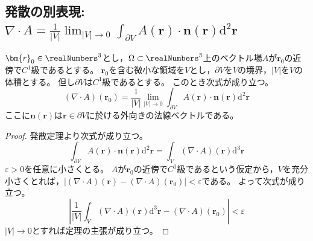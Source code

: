         \subsection{発散の別表現: \texorpdfstring{$\nabla\cdot A = \frac{1}{|V|}\lim_{|V|\to 0} \int_{\partial V} A(\bm{r})\cdot\bm{n}(\bm{r})\mathrm{d}^2\bm{r}$}{発散はベクトル場の法線面積分の体積の商の極限である}}
            \begin{shadebox}
                $\bm{r}_0\in\realNumbers^3$とし，$\Omega\subset\realNumbers^3$上のベクトル場$A$が$\bm{r}_0$の近傍で$C^1$級であるとする。
                $\bm{r}_0$を含む微小な領域を$V$とし，$\partial V$を$V$の境界，$|V|$を$V$の体積とする。
                但し$\partial V$は$C^1$級であるとする。
                このとき次式が成り立つ。
                \[ (\nabla\cdot A)(\bm{r}_0) = \frac{1}{|V|}\lim_{|V|\to 0}\int_{\partial V} A(\bm{r})\cdot\bm{n}(\bm{r})\mathrm{d}^2\bm{r} \]
                ここに$\bm{n}(\bm{r})$は$\bm{r}\in\partial V$に於ける外向きの法線ベクトルである。
            \end{shadebox}
            \begin{proof}
                \quad\par
                発散定理より次式が成り立つ。
                \[ \int_{\partial V} A(\bm{r})\cdot\bm{n}(\bm{r})\mathrm{d}^2\bm{r} = \int_V (\nabla\cdot A)(\bm{r})\mathrm{d}^3\bm{r} \]
                $\varepsilon>0$を任意に小さくとる。
                $A$が$\bm{r}_0$の近傍で$C^1$級であるという仮定から，$V$を充分小さくとれば，$|(\nabla\cdot A)(\bm{r}) - (\nabla\cdot A)(\bm{r}_0)| < \varepsilon$である。
                よって次式が成り立つ。
                \[ \left| \frac{1}{|V|}\int_V (\nabla\cdot A)(\bm{r})\mathrm{d}^3\bm{r} - (\nabla\cdot A)(\bm{r}_0) \right| < \varepsilon \]
                $|V|\to 0$とすれば定理の主張が成り立つ。
            \end{proof}
